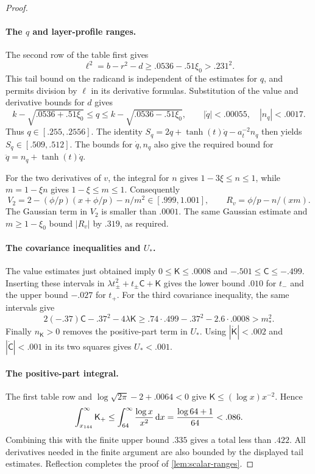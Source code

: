 \begin{proof}
\paragraph{The $q$ and layer-profile ranges.}
The second row of the table first gives
\[
 \ell^2=b-r^2-d\ge.0536-.51\xi_0>.231^2.
\]
This tail bound on the radicand is independent of the estimates for $q$, and permits division by $\ell$ in its derivative formulas. Substitution of the value and derivative bounds for $d$ gives
\[
 k-\sqrt{.0536+.51\xi_0}\le q\le k-\sqrt{.0536-.51\xi_0},\qquad
 |\dot q|<.00055,\quad |n_q|<.0017.
\]
Thus $q\in[.255,.2556]$. The identity $S_q=2q+\tanh(t)\dot q-a_t^{-2}n_q$ then yields $S_q\in[.509,.512]$. The bounds for $\dot q,n_q$ also give the required bound for $\ddot q=n_q+\tanh(t)\dot q$.

For the two derivatives of $v$, the integral for $n$ gives $1-3\xi\le n\le1$, while $m=1-\xi n$ gives $1-\xi\le m\le1$. Consequently
\[
 V_2=2-(\phi/p)(x+\phi/p)-n/m^2\in[.999,1.001],
 \qquad R_v=\phi/p-n/(xm).
\]
The Gaussian term in $V_2$ is smaller than $.0001$. The same Gaussian estimate and $m\ge1-\xi_0$ bound $|R_v|$ by $.319$, as required.

\paragraph{The covariance inequalities and $U_*$.}
The value estimates just obtained imply $0\le\mathsf K\le.0008$ and $-.501\le\mathsf C\le-.499$. Inserting these intervals in $\lambda t_\pm^2+t_\pm\mathsf C+\mathsf K$ gives the lower bound $.010$ for $t_-$ and the upper bound $-.027$ for $t_+$. For the third covariance inequality, the same intervals give
\[
 2(-.37)\mathsf C-.37^2-4\lambda\mathsf K
 \ge.74\cdot.499-.37^2-2.6\cdot.0008>m_*^2.
\]
Finally $n_{\mathsf K}>0$ removes the positive-part term in $U_*$. Using $|\dot{\mathsf K}|<.002$ and $|\dot{\mathsf C}|<.001$ in its two squares gives $U_*<.001$.

\paragraph{The positive-part integral.}
The first table row and $\log\sqrt{2\pi}-2+.0064<0$ give $\mathsf K\le(\log x)x^{-2}$. Hence
\[
 \int_{x_{144}}^\infty\mathsf K_+
 \le\int_{64}^\infty\frac{\log x}{x^2}\,\mathrm{d} x
 =\frac{\log64+1}{64}<.086.
\]
Combining this with the finite upper bound $.335$ gives a total less than $.422$. All derivatives needed in the finite argument are also bounded by the displayed tail estimates. Reflection completes the proof of \cref{lem:scalar-ranges}.
\end{proof}

